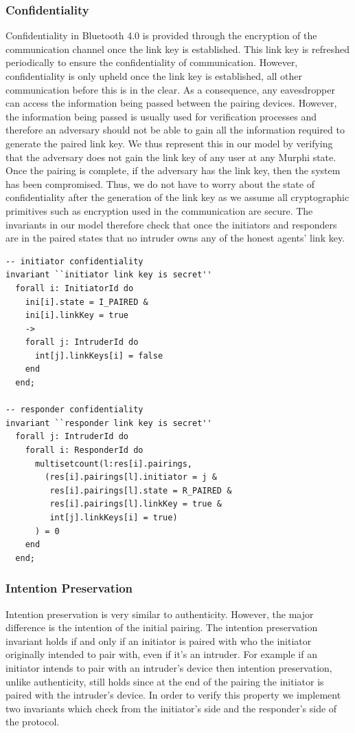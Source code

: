\documentclass{acm_proc_article-sp}
\begin{document}
\subsubsection{Confidentiality}
Confidentiality in Bluetooth 4.0 is provided through the encryption of the communication channel once the link key is established. This link key is refreshed periodically to ensure the confidentiality of communication. However, confidentiality is only upheld once the link key is established, all other communication before this is in the clear. As a consequence, any eavesdropper can access the information being passed between the pairing devices. However, the information being passed is usually used for verification processes and therefore an adversary should not be able to gain all the information required to generate the paired link key. We thus represent this in our model by verifying that the adversary does not gain the link key of any user at any Murphi state. Once the pairing is complete, if the adversary has the link key, then the system has been compromised. Thus, we do not have to worry about the state of confidentiality after the generation of the link key as we assume all cryptographic primitives such as encryption used in the communication are secure. The invariants in our model therefore check that once the initiators and responders are in the paired states that no intruder owns any of the honest agents' link key.

\begin{verbatim}
-- initiator confidentiality
invariant ``initiator link key is secret''
  forall i: InitiatorId do
    ini[i].state = I_PAIRED &
    ini[i].linkKey = true
    ->
    forall j: IntruderId do
      int[j].linkKeys[i] = false
    end
  end;

-- responder confidentiality
invariant ``responder link key is secret''
  forall j: IntruderId do
    forall i: ResponderId do
      multisetcount(l:res[i].pairings, 
        (res[i].pairings[l].initiator = j & 
         res[i].pairings[l].state = R_PAIRED & 
         res[i].pairings[l].linkKey = true & 
         int[j].linkKeys[i] = true)
      ) = 0
    end
  end;
\end{verbatim}

\subsubsection{Intention Preservation}
Intention preservation is very similar to authenticity. However, the major difference is the intention of the initial pairing. The intention preservation invariant holds if and only if an initiator is paired with who the initiator originally intended to pair with, even if it's an intruder. For example if an initiator intends to pair with an intruder's device then intention preservation, unlike authenticity, still holds since at the end of the pairing the initiator is paired with the intruder's device. In order to verify this property we implement two invariants which check from the initiator's side and the responder's side of the protocol.
\end{document}
